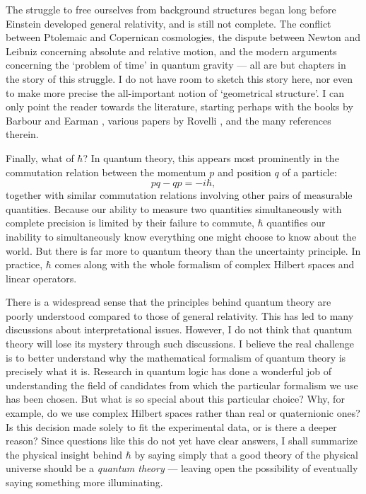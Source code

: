 The struggle to free ourselves from background structures began long
before Einstein developed general relativity, and is still not complete.
The conflict between Ptolemaic and Copernican cosmologies, the dispute
between Newton and Leibniz concerning absolute and relative motion, and
the modern arguments concerning the `problem of time' in quantum gravity
--- all are but chapters in the story of this struggle.  I do not have
room to sketch this story here, nor even to make more precise the
all-important notion of `geometrical structure'.  I can only point the
reader towards the literature, starting perhaps with the books by
Barbour \cite{Barbour} and Earman \cite{Earman}, various papers by
Rovelli \cite{Rovelli1,Rovelli2,Rovelli3}, and the many references therein.  

Finally, what of $\hbar$?  In quantum theory, this appears most 
prominently in the commutation relation between the momentum $p$ and
position $q$ of a particle: 
\[                 pq - qp = -i\hbar  ,\]
together with similar commutation relations involving other pairs of
measurable quantities.   Because our ability to measure two quantities
simultaneously with complete precision is limited by their failure to
commute, $\hbar$ quantifies our inability to simultaneously know
everything one might choose to know about the world.  But there is far
more to quantum theory than the uncertainty principle.  In practice,
$\hbar$ comes along with the whole formalism of complex Hilbert spaces
and linear operators.  

There is a widespread sense that the principles behind quantum theory
are poorly understood compared to those of general relativity.  This has
led to many discussions about interpretational issues.  However, I do
not think that quantum theory will lose its mystery through such
discussions.   I believe the real challenge is to better understand why
the mathematical formalism of quantum theory is precisely what it is. 
Research in quantum logic has done a wonderful job of understanding the
field of candidates from which the particular formalism we use has been
chosen.  But what is so special about this particular choice? 
Why, for example, do we use complex Hilbert spaces rather than real or
quaternionic ones?  Is this decision made solely to fit the experimental
data, or is there a deeper reason?  Since questions like this do not yet
have clear answers, I shall summarize the physical insight behind
$\hbar$ by saying simply that a good theory of the physical universe
should be a {\it quantum theory} --- leaving open the possibility of
eventually saying something more illuminating.

